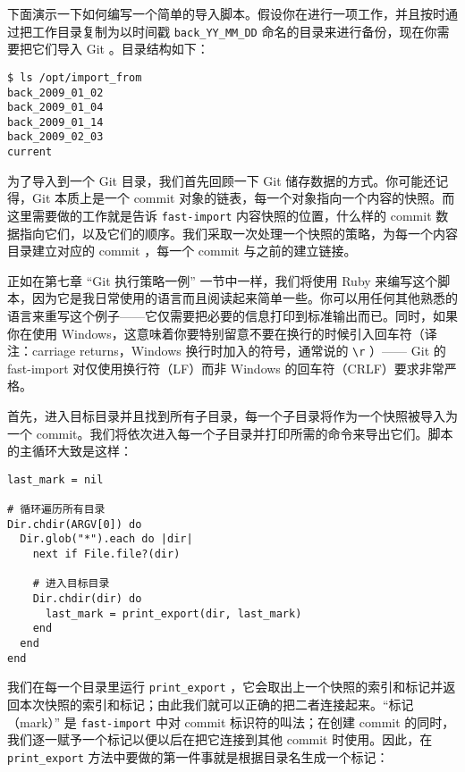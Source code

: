 \documentclass[a4paper]{book}
\begin{document}
下面演示一下如何编写一个简单的导入脚本。假设你在进行一项工作，并且按时通过把工作目录复制为以时间戳 \texttt{back\_YY\_MM\_DD} 命名的目录来进行备份，现在你需要把它们导入 Git 。目录结构如下：

\begin{shaded}\begin{verbatim}
$ ls /opt/import_from
back_2009_01_02
back_2009_01_04
back_2009_01_14
back_2009_02_03
current
\end{verbatim}\end{shaded}

为了导入到一个 Git 目录，我们首先回顾一下 Git 储存数据的方式。你可能还记得，Git 本质上是一个 commit 对象的链表，每一个对象指向一个内容的快照。而这里需要做的工作就是告诉 \texttt{fast-import} 内容快照的位置，什么样的 commit 数据指向它们，以及它们的顺序。我们采取一次处理一个快照的策略，为每一个内容目录建立对应的 commit ，每一个 commit 与之前的建立链接。

正如在第七章 “Git 执行策略一例” 一节中一样，我们将使用 Ruby 来编写这个脚本，因为它是我日常使用的语言而且阅读起来简单一些。你可以用任何其他熟悉的语言来重写这个例子------它仅需要把必要的信息打印到标准输出而已。同时，如果你在使用 Windows，这意味着你要特别留意不要在换行的时候引入回车符（译注：carriage returns，Windows 换行时加入的符号，通常说的 \texttt{\textbackslash{}r} ）------ Git 的 fast-import 对仅使用换行符（LF）而非 Windows 的回车符（CRLF）要求非常严格。

首先，进入目标目录并且找到所有子目录，每一个子目录将作为一个快照被导入为一个 commit。我们将依次进入每一个子目录并打印所需的命令来导出它们。脚本的主循环大致是这样：

\begin{shaded}\begin{verbatim}
last_mark = nil

# 循环遍历所有目录
Dir.chdir(ARGV[0]) do
  Dir.glob("*").each do |dir|
    next if File.file?(dir)

    # 进入目标目录
    Dir.chdir(dir) do 
      last_mark = print_export(dir, last_mark)
    end
  end
end
\end{verbatim}\end{shaded}

我们在每一个目录里运行 \texttt{print\_export} ，它会取出上一个快照的索引和标记并返回本次快照的索引和标记；由此我们就可以正确的把二者连接起来。“标记（mark）” 是 \texttt{fast-import} 中对 commit 标识符的叫法；在创建 commit 的同时，我们逐一赋予一个标记以便以后在把它连接到其他 commit 时使用。因此，在 \texttt{print\_export} 方法中要做的第一件事就是根据目录名生成一个标记：
\end{document}
